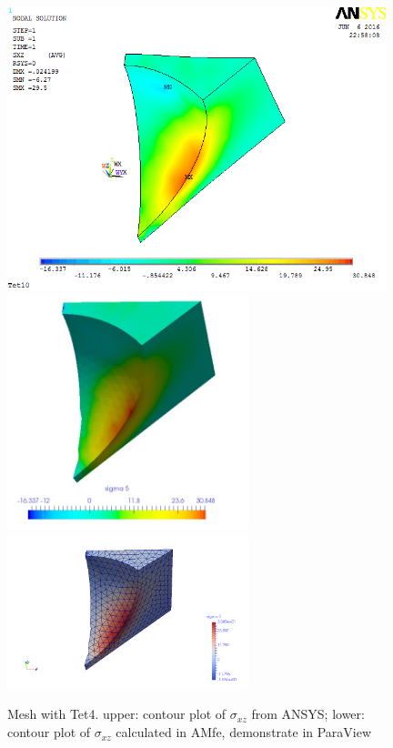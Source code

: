 \begin{figure}[htbp]
	\begin{center}
		\includegraphics[width=11cm,clip]{Tet4Sxz.png} 
		\includegraphics[width=7cm,clip]{Tet4SxzPD.png} 		
		\includegraphics[width=7cm,clip]{Tet4SxzP.png} 		
		\caption{Mesh with Tet4. upper: contour plot of $\sigma_{xz}$ from ANSYS; lower: contour plot of $\sigma_{xz}$ calculated in AMfe, demonstrate in ParaView} \label{fig: Tet4Sxz}
	\end{center}
\end{figure}
\clearpage 

